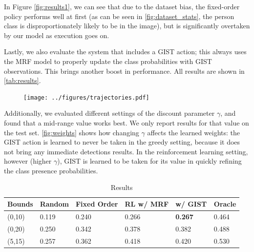 In Figure \autoref{fig:results1}, we can see that due to the dataset bias, the fixed-order policy performs well at first (as can be seen in \autoref{fig:dataset_stats}, the person class is disproportionately likely to be in the image), but is significantly overtaken by our model as execution goes on.

Lastly, we also evaluate the system that includes a GIST action; this always uses the MRF model to properly update the class probabilities with GIST observations.
This brings another boost in performance.
All results are shown in \autoref{tab:results}.

\begin{figure}[h!]
  \centering
  \texttt{[image: ../figures/trajectories.pdf]}
  \caption{}
  \label{fig:trajectories}
\end{figure}

Additionally, we evaluated different settings of the discount parameter $\gamma$, and found that a mid-range value works best.
We only report results for that value on the test set.
\autoref{fig:weights} shows how changing $\gamma$ affects the learned weights: the GIST action is learned to never be taken in the greedy setting, because it does not bring any immediate detections results.
In the reinforcement learning setting, however (higher $\gamma$), GIST is learned to be taken for its value in quickly refining the class presence probabilities.

\begin{table}[t]
\caption{Results}
\label{tab:results}
\begin{center}
\begin{tabular}{|l|l|l|l|l|l|}
\hline
Bounds & Random & Fixed Order & RL w/ MRF & w/ GIST  & Oracle \\ \hline
(0,10) & 0.119  & 0.240       & 0.266     & \textbf{0.267}    & 0.464 \\ 
(0,20) & 0.250  & 0.342       & 0.378     & 0.382    & 0.488 \\ 
(5,15) & 0.257  & 0.362       & 0.418     & 0.420    & 0.530 \\ \hline
\end{tabular}
\end{center}
\end{table}

